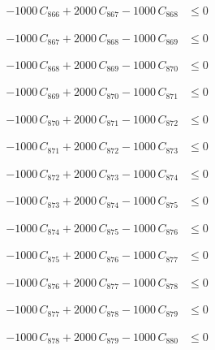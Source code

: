 \documentclass[a4paper,11pt]{article}
\begin{document}
\begin{align}
-1000\,C_{866} + 2000\,C_{867} - 1000\,C_{868} &\leq 0 \nonumber
\end{align}

\begin{align}
-1000\,C_{867} + 2000\,C_{868} - 1000\,C_{869} &\leq 0 \nonumber
\end{align}

\begin{align}
-1000\,C_{868} + 2000\,C_{869} - 1000\,C_{870} &\leq 0 \nonumber
\end{align}

\begin{align}
-1000\,C_{869} + 2000\,C_{870} - 1000\,C_{871} &\leq 0 \nonumber
\end{align}

\begin{align}
-1000\,C_{870} + 2000\,C_{871} - 1000\,C_{872} &\leq 0 \nonumber
\end{align}

\begin{align}
-1000\,C_{871} + 2000\,C_{872} - 1000\,C_{873} &\leq 0 \nonumber
\end{align}

\begin{align}
-1000\,C_{872} + 2000\,C_{873} - 1000\,C_{874} &\leq 0 \nonumber
\end{align}

\begin{align}
-1000\,C_{873} + 2000\,C_{874} - 1000\,C_{875} &\leq 0 \nonumber
\end{align}

\begin{align}
-1000\,C_{874} + 2000\,C_{875} - 1000\,C_{876} &\leq 0 \nonumber
\end{align}

\begin{align}
-1000\,C_{875} + 2000\,C_{876} - 1000\,C_{877} &\leq 0 \nonumber
\end{align}

\begin{align}
-1000\,C_{876} + 2000\,C_{877} - 1000\,C_{878} &\leq 0 \nonumber
\end{align}

\begin{align}
-1000\,C_{877} + 2000\,C_{878} - 1000\,C_{879} &\leq 0 \nonumber
\end{align}

\begin{align}
-1000\,C_{878} + 2000\,C_{879} - 1000\,C_{880} &\leq 0 \nonumber
\end{align}
\end{document}
